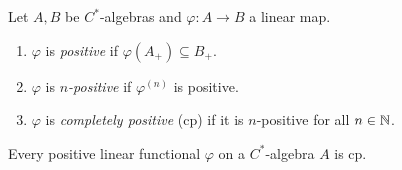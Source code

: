 \begin{definition}
    Let $A, B$ be $C^*$-algebras and $\varphi: A \to B$ a linear map.
    \begin{enumerate}
        \item $\varphi$ is \emph{positive} if $\varphi (A_+) \subseteq B_+$.
        \item $\varphi$ is \emph{$n$-positive} if $\varphi^{(n)}$ is positive.
        \item $\varphi$ is \emph{completely positive} (cp) if it is $n$-positive for all $n \in \mathbb {N}$.
    \end{enumerate} 
\end{definition}

\begin{lemma}
    Every positive linear functional $\varphi$ on a $C^*$-algebra $A$ is cp.
\end{lemma}

